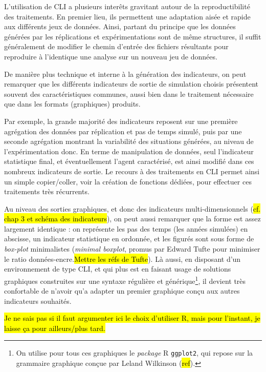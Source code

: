 	L'utilisation de CLI a plusieurs interêts gravitant autour de la reproductibilité des traitements.
	En premier lieu, ils permettent une adaptation aisée et rapide aux différents jeux de données.
	Ainsi, partant du principe que les données générées par les réplications et expérimentations sont de même structures, il suffit généralement de modifier le chemin d'entrée des fichiers résultants pour reproduire à l'identique une analyse sur un nouveau jeu de données.

	De manière plus technique et interne à la génération des indicateurs, on peut remarquer que les différents indicateurs de sortie de simulation choisis présentent souvent des caractéristiques communes, aussi bien dans le traitement nécessaire que dans les formats (graphiques) produits.

	Par exemple, la grande majorité des indicateurs reposent sur une première agrégation des données par réplication et pas de temps simulé, puis par une seconde agrégation montrant la variabilité des situations générées, au niveau de l'expérimentation donc.
	En terme de manipulation de données, seul l'indicateur statistique final, et éventuellement l'agent caractérisé, est ainsi modifié dans ces nombreux indicateurs de sortie.
	Le recours à des traitements en CLI permet ainsi un simple copier/coller, voir la création de fonctions dédiées, pour effectuer ces traitements très récurrents.

	Au niveau des sorties graphiques, et donc des indicateurs multi-dimensionnels (\hl{cf. chap 3 et schéma des indicateurs}), on peut aussi remarquer que la forme est assez largement identique : on représente les pas des temps (les années simulées) en abscisse, un indicateur statistique en ordonnée, et les figurés sont sous forme de \textit{box-plot} minimalistes (\og \textit{minimal boxplot}\fg{}, promus par Edward Tufte pour minimiser le ratio données-encre.\hl{Mettre les réfs de Tufte}).
	Là aussi, en disposant d'un environnement de type CLI, et qui plus est en faisant usage de solutions graphiques construites sur une syntaxe régulière et générique\footnote{
	On utilise pour tous ces graphiques le \textit{package} R \texttt{ggplot2}, qui repose sur la grammaire graphique conçue par Leland Wilkinson (\hl{ref}).
	}, il devient très confortable de n'avoir qu'a adapter un premier graphique conçu aux autres indicateurs souhaités.

	\hl{Je ne sais pas si il faut argumenter ici le choix d'utiliser R, mais pour l'instant, je laisse ça pour ailleurs/plus tard.}

